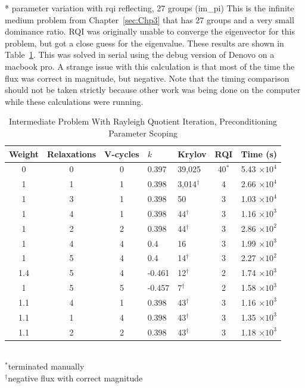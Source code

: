 * parameter variation with rqi reflecting, 27 groups (im\_pi)
This is the infinite medium problem from Chapter~\ref{sec:Chp3} that has 27 groups and a very small dominance ratio. RQI was originally unable to converge the eigenvector for this problem, but got a close guess for the eigenvalue. These results are shown in Table~\ref{table:impi RQI}. This was solved in serial using the debug version of Denovo on a macbook pro. A strange issue with this calculation is that most of the time the flux was correct in magnitude, but negative. Note that the timing comparison should not be taken strictly because other work was being done on the computer while these calculations were running. 
%
\begin{table}[!h]
\caption{Intermediate Problem With Rayleigh Quotient Iteration, Preconditioning Parameter Scoping}
\begin{center}
\begin{tabular}{c c c l l c c}
\hline
Weight & Relaxations & V-cycles & $k$ & Krylov & RQI & Time (s) \\[0.5ex]
\hline
0    & 0 & 0 & 0.397 & 39,025 & 40$^{*}$  & 5.43 $\times 10^{4}$ \\
1    & 1 & 1 & 0.398 & 3,014$^{\dagger}$ & 4 & 2.66 $\times 10^{4}$ \\
1    & 3 & 1 & 0.398 & 50                          & 3 & 1.03 $\times 10^{4}$ \\
1    & 4 & 1 & 0.398 & 44$^{\dagger}$      & 3 & 1.16 $\times 10^{3}$ \\
1    & 2 & 2 & 0.398 & 44$^{\dagger}$      & 3 & 2.86 $\times 10^{2}$ \\
1    & 4 & 4 & 0.4     & 16                          & 3 & 1.99 $\times 10^{3}$ \\
1    & 5 & 4 & 0.4     & 14$^{\dagger}$     & 3 & 2.27 $\times 10^{2}$ \\
1.4 & 5 & 4 & -0.461 & 12$^{\dagger}$    & 2 & 1.74 $\times 10^{3}$ \\
1    & 5 & 5 & -0.457 & 7$^{\dagger}$      & 2 & 1.58 $\times 10^{3}$ \\
\hline
1.1 & 4 & 1 & 0.398 & 43$^{\dagger}$      & 3 & 1.16 $\times 10^{3}$ \\
1.1 & 1 & 4 & 0.398 & 43$^{\dagger}$      & 3 & 1.35 $\times 10^{3}$ \\
1.1 & 2 & 2 & 0.398 & 43$^{\dagger}$      & 3 & 1.18 $\times 10^{3}$ \\
\hline 
\end{tabular}\\
$^{*}$terminated manually\\
$^{\dagger}$negative flux with correct magnitude
\end{center}
\label{table:impi RQI}
\end{table}

